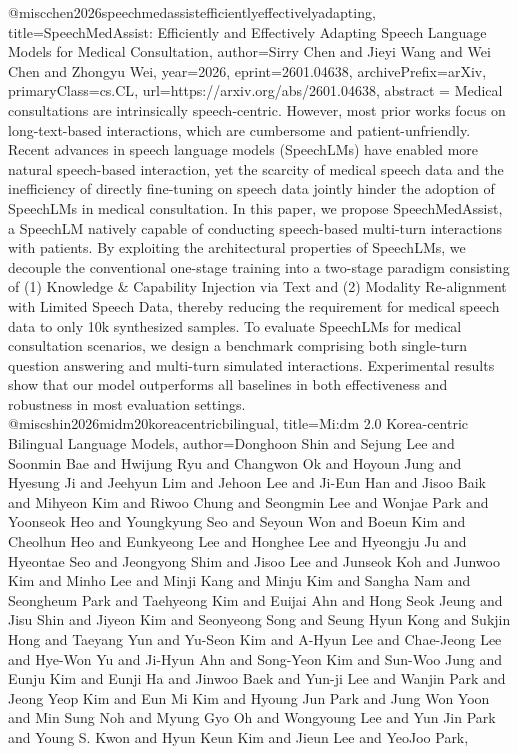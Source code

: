 {}@misc{chen2026speechmedassistefficientlyeffectivelyadapting,
      title={SpeechMedAssist: Efficiently and Effectively Adapting Speech Language Models for Medical Consultation}, 
      author={Sirry Chen and Jieyi Wang and Wei Chen and Zhongyu Wei},
      year={2026},
      eprint={2601.04638},
      archivePrefix={arXiv},
      primaryClass={cs.CL},
      url={https://arxiv.org/abs/2601.04638},
      abstract = {Medical consultations are intrinsically speech-centric. However, most prior works focus on long-text-based interactions, which are cumbersome and patient-unfriendly. Recent advances in speech language models (SpeechLMs) have enabled more natural speech-based interaction, yet the scarcity of medical speech data and the inefficiency of directly fine-tuning on speech data jointly hinder the adoption of SpeechLMs in medical consultation. In this paper, we propose SpeechMedAssist, a SpeechLM natively capable of conducting speech-based multi-turn interactions with patients. By exploiting the architectural properties of SpeechLMs, we decouple the conventional one-stage training into a two-stage paradigm consisting of (1) Knowledge & Capability Injection via Text and (2) Modality Re-alignment with Limited Speech Data, thereby reducing the requirement for medical speech data to only 10k synthesized samples. To evaluate SpeechLMs for medical consultation scenarios, we design a benchmark comprising both single-turn question answering and multi-turn simulated interactions. Experimental results show that our model outperforms all baselines in both effectiveness and robustness in most evaluation settings.}
}@misc{shin2026midm20koreacentricbilingual,
      title={Mi:dm 2.0 Korea-centric Bilingual Language Models}, 
      author={Donghoon Shin and Sejung Lee and Soonmin Bae and Hwijung Ryu and Changwon Ok and Hoyoun Jung and Hyesung Ji and Jeehyun Lim and Jehoon Lee and Ji-Eun Han and Jisoo Baik and Mihyeon Kim and Riwoo Chung and Seongmin Lee and Wonjae Park and Yoonseok Heo and Youngkyung Seo and Seyoun Won and Boeun Kim and Cheolhun Heo and Eunkyeong Lee and Honghee Lee and Hyeongju Ju and Hyeontae Seo and Jeongyong Shim and Jisoo Lee and Junseok Koh and Junwoo Kim and Minho Lee and Minji Kang and Minju Kim and Sangha Nam and Seongheum Park and Taehyeong Kim and Euijai Ahn and Hong Seok Jeung and Jisu Shin and Jiyeon Kim and Seonyeong Song and Seung Hyun Kong and Sukjin Hong and Taeyang Yun and Yu-Seon Kim and A-Hyun Lee and Chae-Jeong Lee and Hye-Won Yu and Ji-Hyun Ahn and Song-Yeon Kim and Sun-Woo Jung and Eunju Kim and Eunji Ha and Jinwoo Baek and Yun-ji Lee and Wanjin Park and Jeong Yeop Kim and Eun Mi Kim and Hyoung Jun Park and Jung Won Yoon and Min Sung Noh and Myung Gyo Oh and Wongyoung Lee and Yun Jin Park and Young S. Kwon and Hyun Keun Kim and Jieun Lee and YeoJoo Park},
}
